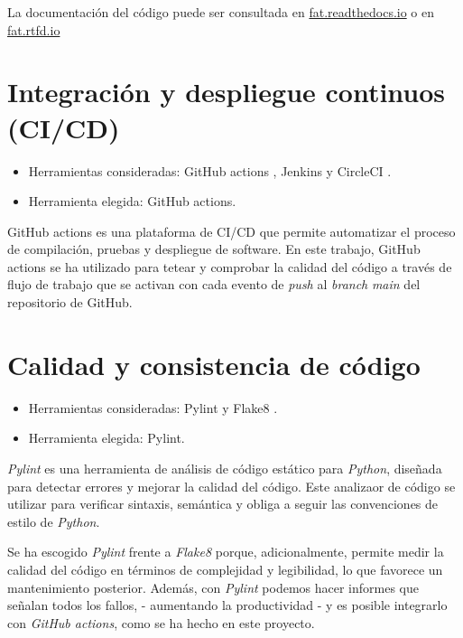 La documentación del código puede ser consultada en \href{https://fat.readthedocs.io/es/latest/intro.html}{fat.readthedocs.io} o en \href{https://fat.readthedocs.io/es/latest/intro.html}{fat.rtfd.io}


\section{Integración y despliegue continuos (CI/CD)}\label{ci_cd}

\begin{itemize}
\tightlist
\item
  Herramientas consideradas: GitHub actions \citep{online:github_actions}, Jenkins \citep{online:jenkins} y CircleCI \citep{online:circle_ci}.
\item
  Herramienta elegida: GitHub actions.
\end{itemize}

GitHub actions es una plataforma de CI/CD que permite automatizar el proceso de compilación,
pruebas y despliegue de software. En este trabajo, GitHub actions se ha utilizado para 
tetear y comprobar la calidad del código a través de flujo de trabajo que se activan con 
cada evento de \emph{push} al \emph{branch} \emph{main} del repositorio de GitHub. 


\section{Calidad y consistencia de código}\label{calidad_codigo}

\begin{itemize}
\tightlist
\item
  Herramientas consideradas: Pylint \citep{online:pylint} y Flake8 \citep{online:flake8}.
\item
  Herramienta elegida: Pylint.
\end{itemize}

\emph{Pylint} es una herramienta de análisis de código estático para \emph{Python}, 
diseñada para detectar errores y mejorar la calidad del código. Este analizaor de código se
utilizar para verificar sintaxis, semántica y obliga a seguir las convenciones de estilo
de \emph{Python}. 

Se ha escogido \emph{Pylint} frente a \emph{Flake8} porque, adicionalmente, permite medir la calidad del código en términos de complejidad y legibilidad, lo que favorece un mantenimiento posterior. Además, con \emph{Pylint} podemos hacer informes que señalan todos los fallos, 
- aumentando la productividad - y es posible integrarlo con \emph{GitHub actions}, como se ha hecho en este proyecto.


